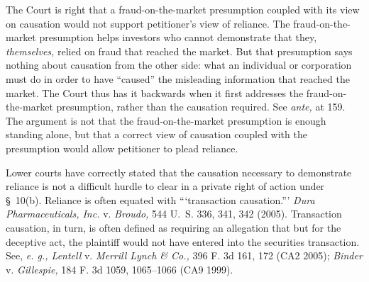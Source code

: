 
  The Court is right that a fraud-on-the-market presumption coupled with its view on causation would not support petitioner's view of reliance. The fraud-on-the-market presumption helps investors who cannot demonstrate that they, \emph{themselves,} relied on fraud that reached the market. But that presumption says nothing about causation from the other side: what an individual or corporation must do in order to have ``caused'' the misleading information that reached the market. The Court thus has it backwards when it first addresses the fraud-on-the-market presumption, rather than the causation required. See \emph{ante,} at 159. The argument is not that the fraud-on-the-market presumption is enough standing alone, but that a correct view of causation coupled with the presumption would allow petitioner to plead reliance.

  Lower courts have correctly stated that the causation necessary to demonstrate reliance is not a difficult hurdle to clear in a private right of action under \S~10(b). Reliance is often equated with ``‘transaction causation.''' \emph{Dura Pharmaceuticals, Inc.} v. \emph{Broudo,} 544 U.~S. 336, 341, 342 (2005). Transaction causation, in turn, is often defined as requiring an allegation that but for the deceptive act, the plaintiff would not have entered into the securities transaction. See, \emph{e. g., Lentell} v. \emph{Merrill Lynch \& Co.,} 396 F. 3d 161, 172 (CA2 2005); \emph{Binder} v. \emph{Gillespie,} 184 F. 3d 1059, 1065--1066 (CA9 1999).

